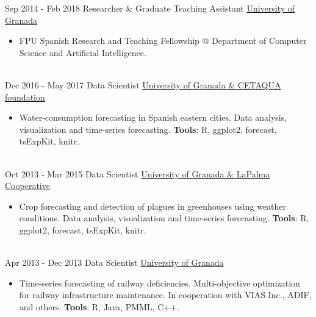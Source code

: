 \documentclass[letterpaper]{twentysecondcv} %
\begin{document}
\begin{twenty} %

\twentyitem
    	{Sep 2014 -}
		{Feb 2018}
        {Researcher \& Graduate Teaching Assistant}
        {\href{http://www.ugr.es/}{University of Granada}}
        {}
        {\begin{itemize}
        \item FPU Spanish Research and Teaching Fellowship @ Department of
Computer Science and Artificial Intelligence.
        \end{itemize}}
        \\
 \twentyitem
    	{Dec 2016 -}
		{May 2017}
        {Data Scientist}
        {\href{http://www.cetaqua.com/en/cetaqua}{University of Granada \& CETAQUA foundation}}
        {}
        {\begin{itemize}
        	\item Water-consumption forecasting in Spanish eastern cities. Data analysis, visualization and time-series forecasting. \textbf{Tools}: R, ggplot2, forecast, tsExpKit, knitr.
        \end{itemize}}
        
\\
 \twentyitem
    	{Oct 2013 -}
		{Mar 2015}
        {Data Scientist}
        {\href{http://www.granadalapalma.com/}{University of Granada \& LaPalma Cooperative}}
        {}
        {\begin{itemize}
        	\item Crop forecasting and detection of plagues in greenhouses using weather conditions. Data analysis, visualization and time-series forecasting. \textbf{Tools}: R, ggplot2, forecast, tsExpKit, knitr.
        \end{itemize}}
        
\\
        
	  \twentyitem
    	{Apr 2013 -}
		{Dec 2013}
        {Data Scientist}
        {\href{https://www.ugr.es/}{University of Granada}}
        {}
        {\begin{itemize}
        	\item Time-series forecasting of railway deficiencies. Multi-objective optimization for railway infrastructure maintenance. In cooperation with VIAS Inc., ADIF, and others.
        	\textbf{Tools}: R, Java, PMML, C++.
        \end{itemize}}
        

\end{twenty}
\end{document}
